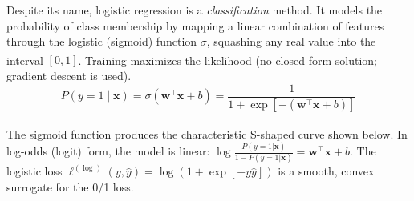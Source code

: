 \begin{tcbitemize}[ skin=sectionraster, halign lower=center ]
    \tcbitem[title={Logistic Regression as a Classification Model}, raster multicolumn=3]
    Despite its name, logistic regression is a \emph{classification} method. It models the probability of class membership by mapping a linear combination of features through the logistic (sigmoid) function $\sigma$, squashing any real value into the interval $[0, 1]$\textsuperscript{\cite[][pp.~89--90]{iiiCourseMachineLearning}}. Training maximizes the likelihood (no closed-form solution; gradient descent is used).
    \tcblower
    \begin{equation}
        P(y = 1 \mid \mathbf{x}) = \sigma\!\left(\mathbf{w}^\top \mathbf{x} + b\right) = \frac{1}{1 + \exp\!\left[-\!\left(\mathbf{w}^\top \mathbf{x} + b\right)\right]}
    \end{equation}

    \tcbitem[title={The Sigmoid Curve and Log-Odds}, raster multicolumn=3]
    The sigmoid function produces the characteristic S-shaped curve shown below\textsuperscript{\cite[][p.89]{iiiCourseMachineLearning}}. In log-odds (logit) form, the model is linear: $\log\frac{P(y=1|\mathbf{x})}{1-P(y=1|\mathbf{x})} = \mathbf{w}^\top\mathbf{x} + b$. The logistic loss $\ell^{(\log)}(y,\hat{y}) = \log(1 + \exp[-y\hat{y}])$ is a smooth, convex surrogate for the 0/1 loss.
    \tcblower
\label{fig:ch05-machine-learning-inline-05}
\end{tcbitemize}

